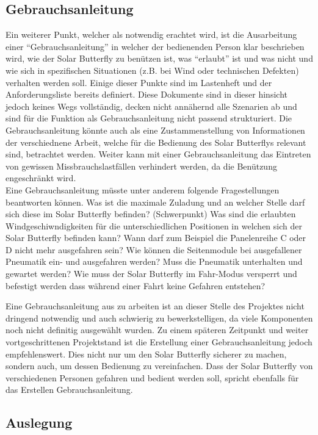 \subsection{Gebrauchsanleitung}
Ein weiterer Punkt, welcher als notwendig erachtet wird, ist die Ausarbeitung einer ``Gebrauchsanleitung'' in welcher der bedienenden Person klar beschrieben wird, wie der Solar Butterfly zu benützen ist, was ``erlaubt'' ist und was nicht und wie sich in spezifischen Situationen (z.B. bei Wind oder technischen Defekten) verhalten werden soll. Einige dieser Punkte sind im Lastenheft und der Anforderungsliste bereits definiert. Diese Dokumente sind in dieser hinsicht jedoch keines Wegs vollständig, decken nicht annähernd alle Szenarien ab und sind für die Funktion als Gebrauchsanleitung nicht passend strukturiert. Die Gebrauchsanleitung könnte auch als eine Zustammenstellung von Informationen der verschiednene Arbeit, welche für die Bedienung des Solar Butterflys relevant sind, betrachtet werden. Weiter kann mit einer Gebrauchsanleitung das Eintreten von gewissen Missbrauchslastfällen verhindert werden, da die Benützung engeschränkt wird.\\
Eine Gebrauchsanleitung müsste unter anderem folgende Fragestellungen beantworten können.
Was ist die maximale Zuladung und an welcher Stelle darf sich diese im Solar Butterfly befinden? (Schwerpunkt)
Was sind die erlaubten Windgeschiwndigkeiten für die unterschiedlichen Positionen in welchen sich der Solar Butterfly befinden kann? Wann darf zum Beispiel die Panelenreihe C oder D nicht mehr ausgefahren sein?
Wie können die Seitenmodule bei ausgefallener Pneumatik ein- und ausgefahren werden? Muss die Pneumatik unterhalten und gewartet werden?
Wie muss der Solar Butterfly im Fahr-Modus versperrt und befestigt werden dass während einer Fahrt keine Gefahren entstehen?

Eine Gebrauchsanleitung aus zu arbeiten ist an dieser Stelle des Projektes nicht dringend notwendig und auch schwierig zu bewerkstelligen, da viele Komponenten noch nicht definitig ausgewählt wurden. Zu einem späteren Zeitpunkt und weiter vortgeschrittenen Projektstand ist die Erstellung einer Gebrauchsanleitung jedoch empfehlenswert. Dies nicht nur um den Solar Butterfly sicherer zu machen, sondern auch, um dessen Bedienung zu vereinfachen. Dass der Solar Butterfly von verschiedenen Personen gefahren und bedient werden soll, spricht ebenfalls für das Erstellen Gebrauchsanleitung.

\subsection{Auslegung}

